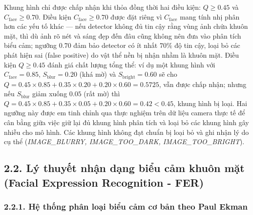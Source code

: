 Khung hình chỉ được chấp nhận khi thỏa đồng thời hai điều kiện: $Q \ge 0.45$ và $C_{\text{face}} \ge 0.70$. Điều kiện $C_{\text{face}} \ge 0.70$ được đặt riêng vì $C_{\text{face}}$ mang tính nhị phân hơn các yếu tố khác --- nếu detector không đủ tin cậy rằng vùng ảnh chứa khuôn mặt, thì dù ảnh rõ nét và sáng đẹp đến đâu cũng không nên đưa vào phân tích biểu cảm; ngưỡng $0.70$ đảm bảo detector có ít nhất $70\%$ độ tin cậy, loại bỏ các phát hiện sai (false positive) do vật thể nền bị nhận nhầm là khuôn mặt. Điều kiện $Q \ge 0.45$ đánh giá chất lượng tổng thể: ví dụ một khung hình với $C_{\text{face}} = 0.85$, $S_{\text{blur}} = 0.20$ (khá mờ) và $S_{\text{bright}} = 0.60$ sẽ cho $Q = 0.45 \times 0.85 + 0.35 \times 0.20 + 0.20 \times 0.60 = 0.5725$, vẫn được chấp nhận; nhưng nếu $S_{\text{blur}}$ giảm xuống $0.05$ (rất mờ) thì $Q = 0.45 \times 0.85 + 0.35 \times 0.05 + 0.20 \times 0.60 = 0.42 < 0.45$, khung hình bị loại. Hai ngưỡng này được em tinh chỉnh qua thực nghiệm trên dữ liệu camera thực tế để cân bằng giữa việc giữ lại đủ khung hình phân tích và loại bỏ các khung hình gây nhiễu cho mô hình. Các khung hình không đạt chuẩn bị loại bỏ và ghi nhận lý do cụ thể (\textit{IMAGE\_BLURRY, IMAGE\_TOO\_DARK, IMAGE\_TOO\_BRIGHT}).

\subsection*{2.2. Lý thuyết nhận dạng biểu cảm khuôn mặt (Facial Expression Recognition - FER)}

\subsubsection*{2.2.1. Hệ thống phân loại biểu cảm cơ bản theo Paul Ekman}

